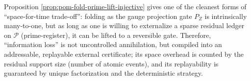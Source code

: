\begin{remark}\label{rem:pom-fold-lossless}
Proposition \ref{prop:pom-fold-prime-lift-injective} gives one of the cleanest forms of ``space-for-time trade-off'': folding as the gauge projection gate \(P_Z\) is intrinsically many-to-one, but as long as one is willing to externalize a sparse residual ledger on \(\mathcal P\) (prime-register), it can be lifted to a reversible gate.
Therefore, ``information loss'' is not uncontrolled annihilation, but compiled into an addressable, replayable external certificate; its space overhead is counted by the residual support size (number of atomic events), and its replayability is guaranteed by unique factorization and the deterministic strategy.
\end{remark}

